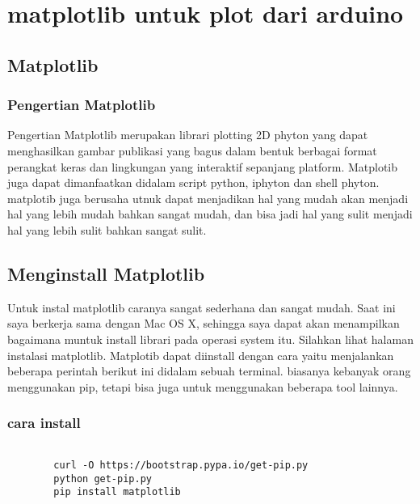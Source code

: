 
\section {matplotlib untuk plot dari arduino}

\subsection {Matplotlib}
\subsubsection {Pengertian Matplotlib}
	Pengertian Matplotlib merupakan librari plotting 2D phyton yang dapat menghasilkan gambar publikasi yang bagus dalam bentuk berbagai format perangkat keras dan lingkungan yang interaktif sepanjang platform. Matplotib juga dapat dimanfaatkan didalam script python, iphyton dan shell phyton. matplotib juga berusaha utnuk dapat menjadikan hal yang mudah akan menjadi hal yang lebih mudah bahkan sangat mudah, dan bisa jadi hal yang sulit menjadi hal yang lebih sulit bahkan sangat sulit.
	
\subsection {Menginstall Matplotlib}
	Untuk instal matplotlib caranya sangat sederhana dan sangat mudah. Saat ini saya berkerja sama dengan Mac OS X, sehingga saya dapat akan menampilkan bagaimana muntuk install librari pada operasi system itu. Silahkan lihat halaman instalasi matplotlib.	Matplotib dapat diinstall dengan cara yaitu menjalankan beberapa perintah berikut ini didalam sebuah terminal. biasanya kebanyak orang menggunakan pip, tetapi bisa juga untuk menggunakan beberapa tool lainnya.

	\subsubsection{cara install}
	\begin{verbatim} 
	
		curl -O https://bootstrap.pypa.io/get-pip.py
		python get-pip.py
		pip install matplotlib

	\end{verbatim}
	
